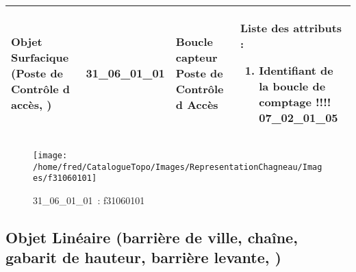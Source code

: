 \documentclass[12pt,titlepage]{book}
\begin{document}
\renewcommand{\arraystretch}{1.2}
\begin{supertabular}{|p{10cm}|c|p{13cm}|p{12cm}|}
 Objet Surfacique (Poste de Contrôle d accès,  ) & 31\_06\_01\_01 & Boucle capteur Poste de Contrôle d Accès & Liste des attributs :
\begin{enumerate}
  \item Identifiant de la boucle de comptage !!!!  07\_02\_01\_05\end{enumerate}
\\
\hline
\end{supertabular}
\begin{figure}[h!]
  \hfill         %
  \begin{minipage}[t]{3cm}
    \begin{center}
      \texttt{[image: /home/fred/CatalogueTopo/Images/RepresentationChagneau/Images/f31060101]}
      \caption[~31\_06\_01\_01]{\small{31\_06\_01\_01~:} \tiny{f31060101}}\label{f31060101}
    \end{center}
  \end{minipage}
\end{figure}


\subsection{Objet Linéaire (barrière de ville, chaîne, gabarit de hauteur, barrière levante,  )}
\noindent
\vspace{\baselineskip}
\end{document}
